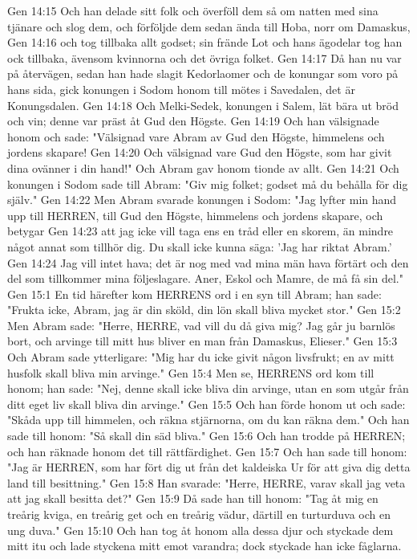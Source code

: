 Gen 14:15  Och han delade sitt folk och överföll dem så om natten med sina tjänare och slog dem, och förföljde dem sedan ända till Hoba, norr om Damaskus,
Gen 14:16  och tog tillbaka allt godset; sin frände Lot och hans ägodelar tog han ock tillbaka, ävensom kvinnorna och det övriga folket.
Gen 14:17  Då han nu var på återvägen, sedan han hade slagit Kedorlaomer och de konungar som voro på hans sida, gick konungen i Sodom honom till mötes i Savedalen, det är Konungsdalen.
Gen 14:18  Och Melki-Sedek, konungen i Salem, lät bära ut bröd och vin; denne var präst åt Gud den Högste.
Gen 14:19  Och han välsignade honom och sade: "Välsignad vare Abram av Gud den Högste, himmelens och jordens skapare!
Gen 14:20  Och välsignad vare Gud den Högste, som har givit dina ovänner i din hand!" Och Abram gav honom tionde av allt.
Gen 14:21  Och konungen i Sodom sade till Abram: "Giv mig folket; godset må du behålla för dig själv."
Gen 14:22  Men Abram svarade konungen i Sodom: "Jag lyfter min hand upp till HERREN, till Gud den Högste, himmelens och jordens skapare, och betygar
Gen 14:23  att jag icke vill taga ens en tråd eller en skorem, än mindre något annat som tillhör dig. Du skall icke kunna säga: 'Jag har riktat Abram.'
Gen 14:24  Jag vill intet hava; det är nog med vad mina män hava förtärt och den del som tillkommer mina följeslagare. Aner, Eskol och Mamre, de må få sin del."
Gen 15:1  En tid härefter kom HERRENS ord i en syn till Abram; han sade: "Frukta icke, Abram, jag är din sköld, din lön skall bliva mycket stor."
Gen 15:2  Men Abram sade: "Herre, HERRE, vad vill du då giva mig? Jag går ju barnlös bort, och arvinge till mitt hus bliver en man från Damaskus, Elieser."
Gen 15:3  Och Abram sade ytterligare: "Mig har du icke givit någon livsfrukt; en av mitt husfolk skall bliva min arvinge."
Gen 15:4  Men se, HERRENS ord kom till honom; han sade: "Nej, denne skall icke bliva din arvinge, utan en som utgår från ditt eget liv skall bliva din arvinge."
Gen 15:5  Och han förde honom ut och sade: "Skåda upp till himmelen, och räkna stjärnorna, om du kan räkna dem." Och han sade till honom: "Så skall din säd bliva."
Gen 15:6  Och han trodde på HERREN; och han räknade honom det till rättfärdighet.
Gen 15:7  Och han sade till honom: "Jag är HERREN, som har fört dig ut från det kaldeiska Ur för att giva dig detta land till besittning."
Gen 15:8  Han svarade: "Herre, HERRE, varav skall jag veta att jag skall besitta det?"
Gen 15:9  Då sade han till honom: "Tag åt mig en treårig kviga, en treårig get och en treårig vädur, därtill en turturduva och en ung duva."
Gen 15:10  Och han tog åt honom alla dessa djur och styckade dem mitt itu och lade styckena mitt emot varandra; dock styckade han icke fåglarna.
